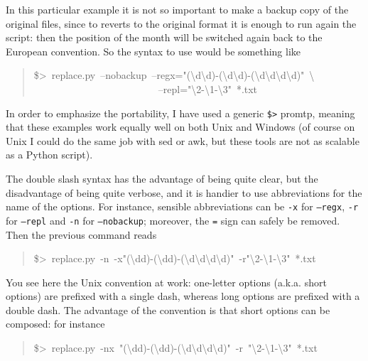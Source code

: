 \documentclass[10pt,english]{article}
\begin{document}
In this particular example it is not so important to make a backup
copy of the original files, since to reverts to the original
format it is enough to run again the script: then the position
of the month will be switched again back to the European 
convention. So the syntax to use would be something like
\begin{quote}
\begin{ttfamily}\begin{flushleft}
\mbox{{\$}>~replace.py~--nobackup~--regx="({\textbackslash}d{\textbackslash}d)-({\textbackslash}d{\textbackslash}d)-({\textbackslash}d{\textbackslash}d{\textbackslash}d{\textbackslash}d)"~{\textbackslash}}\\
\mbox{~~~~~~~~~~~~~~~~~~~~~~~~~--repl="{\textbackslash}2-{\textbackslash}1-{\textbackslash}3"~*.txt}
\end{flushleft}\end{ttfamily}
\end{quote}

In order to emphasize the portability, I have used a generic 
\texttt{{\$}>} promtp, meaning that these examples work equally well on
both Unix and Windows (of course on Unix I could do the same 
job with sed or awk, but these tools are not as scalable as
a Python script).

The double slash syntax has the advantage of being
quite clear, but the disadvantage of being quite verbose, and it is
handier to use abbreviations for the name of the options. For instance, 
sensible abbreviations can be \texttt{-x} for \texttt{--regx}, \texttt{-r} for \texttt{--repl} 
and \texttt{-n} for \texttt{--nobackup}; moreover, the \texttt{=} sign can safely be
removed. Then the previous command reads
\begin{quote}
\begin{ttfamily}\begin{flushleft}
\mbox{{\$}>~replace.py~-n~-x"({\textbackslash}dd)-({\textbackslash}dd)-({\textbackslash}d{\textbackslash}d{\textbackslash}d{\textbackslash}d)"~-r"{\textbackslash}2-{\textbackslash}1-{\textbackslash}3"~*.txt}
\end{flushleft}\end{ttfamily}
\end{quote}

You see here the Unix convention at work: one-letter options
(a.k.a. short options) are prefixed with a single dash, whereas 
long options are prefixed with a double dash. The advantage of the 
convention is that short options can be composed: for instance
\begin{quote}
\begin{ttfamily}\begin{flushleft}
\mbox{{\$}>~replace.py~-nx~"({\textbackslash}dd)-({\textbackslash}dd)-({\textbackslash}d{\textbackslash}d{\textbackslash}d{\textbackslash}d)"~-r~"{\textbackslash}2-{\textbackslash}1-{\textbackslash}3"~*.txt}
\end{flushleft}\end{ttfamily}
\end{quote}
\end{document}
